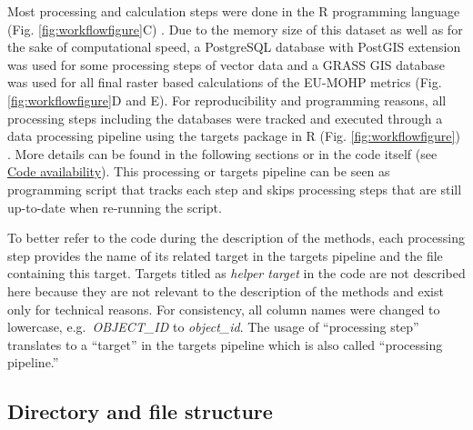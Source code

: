\documentclass[fleqn,10pt]{wlscirep}
\begin{document}
Most processing and calculation steps were done in the R programming language (Fig. \ref{fig:workflowfigure}C) \cite{r_core_team_r_2020}. Due to the memory size of this dataset as well as for the sake of computational speed, a PostgreSQL database with PostGIS extension was used for some processing steps of vector data and a GRASS GIS database was used for all final raster based calculations of the EU-MOHP metrics (Fig. \ref{fig:workflowfigure}D and E). For reproducibility and programming reasons, all processing steps including the databases were tracked and executed through a data processing pipeline using the targets package in R (Fig. \ref{fig:workflowfigure}) \cite{landau_targets_2021}. More details can be found in the following sections or in the code itself (see \protect\hyperlink{code-availability}{Code availability}). This processing or targets pipeline can be seen as programming script that tracks each step and skips processing steps that are still up-to-date when re-running the script.

To better refer to the code during the description of the methods, each processing step provides the name of its related target in the targets pipeline and the file containing this target. Targets titled as \emph{helper target} in the code are not described here because they are not relevant to the description of the methods and exist only for technical reasons. For consistency, all column names were changed to lowercase, e.g.~\emph{OBJECT\_ID} to \emph{object\_id}. The usage of ``processing step'' translates to a ``target'' in the targets pipeline which is also called ``processing pipeline.''

\hypertarget{directory-and-file-structure}{%
\subsection*{Directory and file structure}\label{directory-and-file-structure}}
\end{document}
